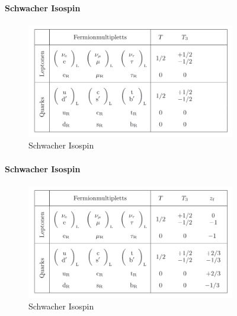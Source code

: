 \begin{nframe}
	\framesubtitle{Schwacher Isospin}
	\begin{figure}
		\includegraphics[height=5cm]{img/isospin3}
		\caption*{Schwacher Isospin\cite{povh}}
	\end{figure}
\end{nframe}

\begin{nframe}
	\framesubtitle{Schwacher Isospin}
	\begin{figure}
		\includegraphics[height=5cm]{img/isospin}
		\caption*{Schwacher Isospin\cite{povh}}
	\end{figure}
\end{nframe}

